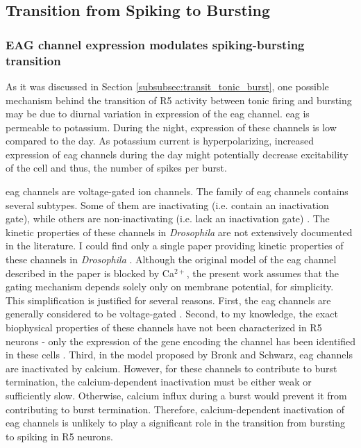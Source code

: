 \documentclass[../main.tex]{subfiles}
\begin{document}
\subsection{Transition from Spiking to Bursting}

\subsubsection{EAG channel expression modulates spiking-bursting transition}

\noindent As it was discussed in Section \ref{subsubsec:transit_tonic_burst}, one possible mechanism behind the transition of R5 activity between tonic firing and bursting may be due to diurnal variation in expression of the \gls{eag} channel. \gls{eag} is permeable to potassium. During the night, expression of these channels is low compared to the day. %
As potassium current is hyperpolarizing, increased expression of \gls{eag} channels during the day might potentially decrease excitability of the cell and thus, the number of spikes per burst.

\gls{eag} channels are voltage-gated ion channels. The family of \gls{eag} channels contains several subtypes. Some of them are inactivating (i.e. contain an inactivation gate), while others are non-inactivating (i.e. lack an inactivation gate) \parencite{bauerEtheragogoChannelsEffective2018}.
The kinetic properties of these channels in \textit{Drosophila} are not extensively documented in the literature. I could find only a single paper providing kinetic properties of these channels in \textit{Drosophila} \parencite{bronkRegulationEagCa22018}. Although the original model of the \gls{eag} channel described in the paper is blocked by Ca$^{2+}$, the present work assumes that the gating mechanism depends solely only on membrane potential, for simplicity. This simplification is justified for several reasons. First, the \gls{eag} channels are generally considered to be voltage-gated \cite{bauerEtheragogoChannelsEffective2018}. Second, to my knowledge, the exact biophysical properties of these channels have not been characterized in R5 neurons - only the expression of the gene encoding the channel has been identified in these cells \cite{doppSinglecellTranscriptomicsReveals2024}. Third, in the model proposed by Bronk and Schwarz, \gls{eag} channels are inactivated by calcium. However, for these channels to contribute to burst termination, the calcium-dependent inactivation must be either weak or sufficiently slow. Otherwise, calcium influx during a burst would prevent it from contributing to burst termination.
Therefore, calcium-dependent inactivation of \gls{eag} channels is unlikely to play a significant role in the transition from bursting to spiking in R5 neurons.
\end{document}
